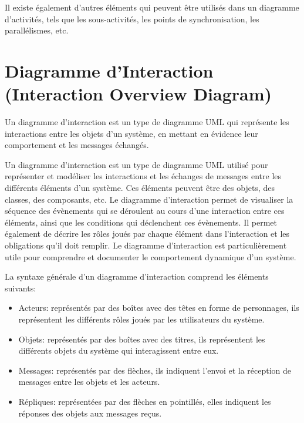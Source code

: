 Il existe également d'autres éléments qui peuvent être utilisés dans un diagramme d'activités, tels que les sous-activités, les points de synchronisation, les parallélismes, etc.



\newpage
\section{Diagramme d'Interaction (Interaction Overview Diagram)}\label{sec:diagrammeinteraction}

\begin{definition}
Un diagramme d'interaction est un type de diagramme UML qui représente les interactions entre les objets d'un système, en mettant en évidence leur comportement et les messages échangés.

Un diagramme d'interaction est un type de diagramme UML utilisé pour représenter et modéliser les interactions et les échanges de messages entre les différents éléments d'un système. Ces éléments peuvent être des objets, des classes, des composants, etc. Le diagramme d'interaction permet de visualiser la séquence des évènements qui se déroulent au cours d'une interaction entre ces éléments, ainsi que les conditions qui déclenchent ces évènements. Il permet également de décrire les rôles joués par chaque élément dans l'interaction et les obligations qu'il doit remplir. Le diagramme d'interaction est particulièrement utile pour comprendre et documenter le comportement dynamique d'un système.
\end{definition}

La syntaxe générale d'un diagramme d'interaction comprend les éléments suivants:
\begin{itemize}
\item Acteurs: représentés par des boîtes avec des têtes en forme de personnages, ils représentent les différents rôles joués par les utilisateurs du système.
\item Objets: représentés par des boîtes avec des titres, ils représentent les différents objets du système qui interagissent entre eux.
\item Messages: représentés par des flèches, ils indiquent l'envoi et la réception de messages entre les objets et les acteurs.
\item Répliques: représentées par des flèches en pointillés, elles indiquent les réponses des objets aux messages reçus.
\end{itemize}


